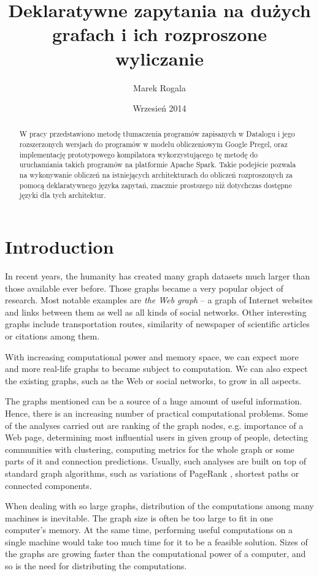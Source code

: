 \documentclass{pracamgr}
\author{Marek Rogala}
\title{Deklaratywne zapytania na dużych grafach i ich rozproszone wyliczanie}
\date{Wrzesień 2014}
\theoremstyle{plain}
\theoremstyle{definition}
\theoremstyle{remark}
\begin{document}
\maketitle

\begin{abstract}
W pracy przedstawiono metodę tłumaczenia programów zapisanych w Datalogu
i jego rozszerzonych wersjach do programów w modelu obliczeniowym Google Pregel,
oraz implementację prototypowego kompilatora wykorzystującego tę metodę do uruchamiania takich programów na platformie Apache Spark.
Takie podejście pozwala na wykonywanie obliczeń na istniejących architekturach do obliczeń rozproszonych
za pomocą deklaratywnego języka zapytań, znacznie prostszego niż dotychczas dostępne języki dla tych architektur.
\end{abstract}

\tableofcontents

\chapter*{Introduction}
In recent years, the humanity has created many graph datasets much larger than those available ever before.
Those graphs became a very popular object of research. Most notable examples are \emph{the Web graph} -- a graph of Internet websites and links between them as well as all kinds of social networks. Other interesting graphs include transportation routes, similarity of newspaper of scientific articles or citations among them.

With increasing computational power and memory space, we can expect more and more real-life graphs to became subject to computation. We can also expect the existing graphs, such as the Web or social networks, to grow in all aspects.

The graphs mentioned can be a source of a huge amount of useful information. Hence, there is an increasing number of practical computational problems.
Some of the analyses carried out are ranking of the graph nodes, e.g. importance of a Web page, determining most influential users in given group of people, detecting communities with clustering, computing metrics for the whole graph or some parts of it and connection predictions.
Usually, such analyses are built on top of standard graph algorithms, such as variations of PageRank \cite{pagerank}, shortest paths or connected components.

When dealing with so large graphs, distribution of the computations among many machines is inevitable. The graph size is often be too large to fit in one computer's memory. At the same time, performing useful computations on a single machine would take too much time for it to be a feasible solution. Sizes of the graphs are growing faster than the computational power of a computer, and so is the need for distributing the computations.
\end{document}
